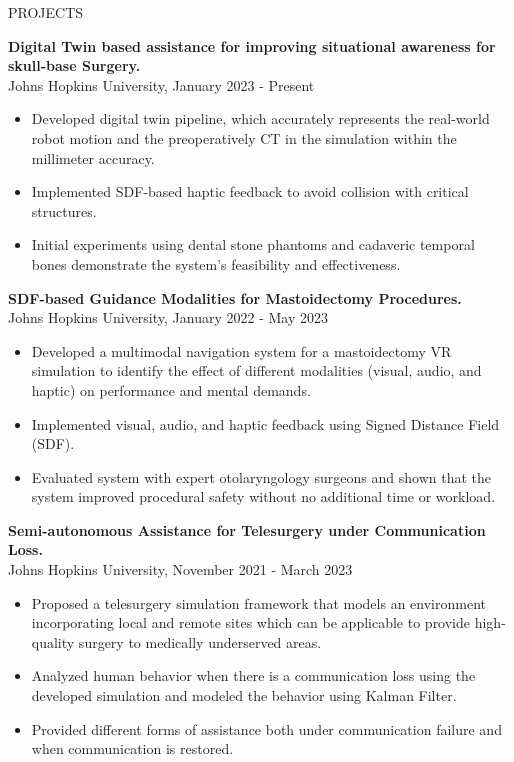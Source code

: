 \documentclass{resume} %
\begin{document}
\begin{rSection}{PROJECTS}
\vspace{-1.25em}
\item \textbf{Digital Twin based assistance for improving situational awareness for skull-base Surgery.}\\
Johns Hopkins University, January 2023 - Present
\begin{itemize}
\itemsep -3pt {} 
\item Developed digital twin pipeline, which accurately represents the real-world robot motion and the preoperatively CT in the simulation within the millimeter accuracy.
\item Implemented SDF-based haptic feedback to avoid collision with critical structures.
\item Initial experiments using dental stone phantoms and cadaveric temporal bones demonstrate the system’s feasibility and effectiveness.
\end{itemize}

\item \textbf{SDF-based Guidance Modalities for
Mastoidectomy Procedures.}\\
Johns Hopkins University, January 2022 - May 2023
\begin{itemize}
\itemsep -3pt {} 
\item Developed a multimodal navigation system for a mastoidectomy VR simulation to identify the effect of different modalities (visual, audio, and haptic) on performance and mental demands.
    \item Implemented visual, audio, and haptic feedback using Signed Distance Field (SDF).
    \item Evaluated system with expert otolaryngology surgeons and shown that the system improved procedural safety without no additional time or workload.
\end{itemize}
\item \textbf{Semi-autonomous Assistance for Telesurgery
under Communication Loss.}\\
Johns Hopkins University, November 2021 - March 2023

\begin{itemize}
\itemsep -3pt {} 
    \item Proposed a telesurgery simulation framework that models an environment incorporating local and remote sites which can be applicable to provide high-quality surgery to medically underserved areas.
    \item Analyzed human behavior when there is a communication loss using the developed simulation and modeled the behavior using Kalman Filter.
    \item Provided different forms of assistance both under communication failure and when communication is restored. 
    

\end{itemize}
\end{rSection}
\end{document}
